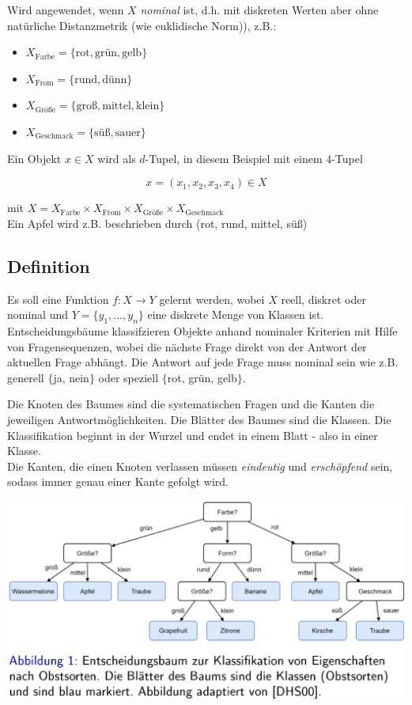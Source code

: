 \documentclass{report}
\begin{document}
Wird angewendet, wenn $X$ \textit{nominal} ist, d.h. mit diskreten Werten aber ohne
natürliche Distanzmetrik  (wie euklidische Norm)), z.B.:\\
\vspace*{-1.5em}
\begin{itemize}
  \item $X_{\text{Farbe}} = \{\text{rot}, \text{grün}, \text{gelb}\}$
  \item $X_{\text{From}} = \{\text{rund}, \text{dünn}\}$
  \item $X_{\text{Größe}} = \{\text{groß}, \text{mittel}, \text{klein}\}$
  \item $X_{\text{Geschmack}} = \{\text{süß}, \text{sauer}\}$
\end{itemize}

Ein Objekt $x\in X$ wird als $d$-Tupel, in diesem Beispiel mit einem $4$-Tupel

$$x = (x_1, x_2, x_3, x_4)\in X$$

mit $X = X_{\text{Farbe}} \times X_{\text{From}} \times X_{\text{Größe}} \times X_{\text{Geschmack}}$\\
Ein Apfel wird z.B. beschrieben durch (rot, rund, mittel, süß)

\subsection{Definition}

Es soll eine Funktion $f: X\rightarrow Y$ gelernt werden, wobei $X$ reell, diskret oder nominal und $Y = \{y_1, ..., y_n\}$
eine diskrete Menge von Klassen ist.\\
Entscheidungsbäume klassifzieren Objekte anhand nominaler Kriterien mit Hilfe von Fragensequenzen, wobei die nächste Frage
direkt von der Antwort der aktuellen Frage abhängt. Die Antwort auf jede Frage muss nominal sein wie z.B. generell $\{$ja, nein$\}$
oder speziell $\{$rot, grün, gelb$\}$.\par
Die Knoten des Baumes sind die systematischen Fragen und die Kanten die jeweiligen Antwortmöglichkeiten. Die Blätter des
Baumes sind die Klassen. Die Klassifikation beginnt in der Wurzel und endet in einem Blatt - also in einer Klasse.\\
Die Kanten, die einen Knoten verlassen müssen \textit{eindeutig} und \textit{erschöpfend} sein, sodass immer genau einer Kante
gefolgt wird.

\begin{center}
  \includegraphics[scale=.285]{ml07_1}
\end{center}
\end{document}
